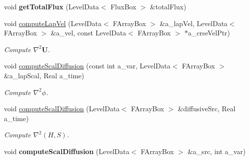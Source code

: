 \begin{DoxyCompactItemize}
\item 
\hypertarget{class_a_m_r_level_mushy_layer_a6741ef0d7091e2c65c4e4b9f9d5a172a}{void {\bfseries get\-Total\-Flux} (Level\-Data$<$ Flux\-Box $>$ \&total\-Flux)}\label{class_a_m_r_level_mushy_layer_a6741ef0d7091e2c65c4e4b9f9d5a172a}

\item 
\hypertarget{class_a_m_r_level_mushy_layer_a4a641297a46991e7aca4ab750b347a1f}{void \hyperlink{class_a_m_r_level_mushy_layer_a4a641297a46991e7aca4ab750b347a1f}{compute\-Lap\-Vel} (Level\-Data$<$ F\-Array\-Box $>$ \&a\-\_\-lap\-Vel, Level\-Data$<$ F\-Array\-Box $>$ \&a\-\_\-vel, const Level\-Data$<$ F\-Array\-Box $>$ $\ast$a\-\_\-crse\-Vel\-Ptr)}\label{class_a_m_r_level_mushy_layer_a4a641297a46991e7aca4ab750b347a1f}

\begin{DoxyCompactList}\small\item\em Compute $ \nabla^2 \mathbf{U} $. \end{DoxyCompactList}\item 
\hypertarget{class_a_m_r_level_mushy_layer_ae23a8e865baef2bc23d79e7839c2a31b}{void \hyperlink{class_a_m_r_level_mushy_layer_ae23a8e865baef2bc23d79e7839c2a31b}{compute\-Scal\-Diffusion} (const int a\-\_\-var, Level\-Data$<$ F\-Array\-Box $>$ \&a\-\_\-lap\-Scal, Real a\-\_\-time)}\label{class_a_m_r_level_mushy_layer_ae23a8e865baef2bc23d79e7839c2a31b}

\begin{DoxyCompactList}\small\item\em Compute $ \nabla^2 \phi $. \end{DoxyCompactList}\item 
\hypertarget{class_a_m_r_level_mushy_layer_a00dc47be23a770c7a546a2b79a7bcf5c}{void \hyperlink{class_a_m_r_level_mushy_layer_a00dc47be23a770c7a546a2b79a7bcf5c}{compute\-Scal\-Diffusion} (Level\-Data$<$ F\-Array\-Box $>$ \&diffusive\-Src, Real a\-\_\-time)}\label{class_a_m_r_level_mushy_layer_a00dc47be23a770c7a546a2b79a7bcf5c}

\begin{DoxyCompactList}\small\item\em Compute $ \nabla^2 (H, S) $. \end{DoxyCompactList}\item 
\hypertarget{class_a_m_r_level_mushy_layer_a9af796bb0c94d60cb54d97c3c935bfdf}{void {\bfseries compute\-Scal\-Diffusion} (Level\-Data$<$ F\-Array\-Box $>$ \&a\-\_\-src, int a\-\_\-var)}\label{class_a_m_r_level_mushy_layer_a9af796bb0c94d60cb54d97c3c935bfdf}


\end{DoxyCompactItemize}
